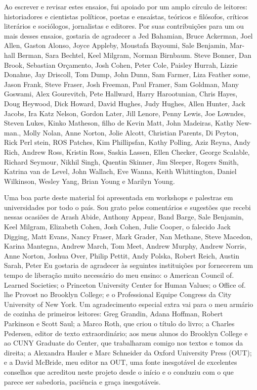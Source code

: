 Ao escrever e revisar estes ensaios, fui apoiado por um amplo círculo de leitores: historiadores e cientistas políticos, poetas e ensaístas, teóricos e filósofos, críticos literários e sociólogos, jornalistas e editores. Por suas contribuições para um ou mais desses ensaios, gostaria de agradecer a Jed Bahamian, Bruce Ackerman, Joel Allen, Gaston Alonso, Joyce Appleby, Moustafa Bayoumi, Sale Benjamin, Mar-hall Berman, Sara Bechtel, Keel Milgram, Norman Birnbaum.  Steve Bonner, Dan Brook, Sebastian Orçamento, Josh Cohen, Peter Cole, Paisley Hurrah, Lizzie Donahue, Jay Driscoll, Tom Dump, John Dunn, Sam Farmer, Liza Feather some, Jason Frank, Steve Fraser, Josh Freeman, Paul Framer, Sam Goldman, Many Goswami, Alex Gourevitch, Pete Hallward, Harry Harootunian, Chris Hayes, Doug Heywood, Dick Howard, David Hughes, Judy Hughes, Allen Hunter, Jack Jacobs, Ira Katz Nelson, Gordon Later, Jill Lenore, Penny Lewis, Joe Lowndes, Steven Lukes, Kinko Matheson, filho de Kevin Matt, John Madeiras, Kathy New-man., Molly Nolan, Anne Norton, Jolie Alcott, Christian Parents, Di Peyton, Rick Perl stein, ROS Patches, Kim Phillipsfan, Kathy Polling, Aziz Reyna, Andy Rich, Andrew Ross, Kristin Ross, Saskia Lassen, Ellen Checker, George Scalable, Richard Seymour, Nikhil Singh, Quentin Skinner, Jim Sleeper, Rogers Smith, Katrina van de Level, John Wallach, Eve Wanna, Keith Whittington, Daniel Wilkinson, Wesley Yang, Brian Young e Marilyn Young.
 
\par
 
Uma boa parte deste material foi apresentada em workshops e palestras em universidades por todo o país. Sou grato pelos comentários e sugestões que recebi nessas ocasiões de Arash Abide, Anthony Appear, Band Barge, Sale Benjamin, Keel Milgram, Elizabeth Cohen, Josh Cohen, Julie Cooper, o falecido Jack Digging, Matt Evans, Nancy Fraser, Mark Grader, Nan Methane, Steve Macedon, Karina Mantegna, Andrew March, Tom Meet, Andrew Murphy, Andrew Norris, Anne Norton, Joshua Over, Philip Pettit, Andy Polska, Robert Reich, Austin Sarah, Peter Eu gostaria de agradecer às seguintes instituições por fornecerem um tempo de liberação muito necessário do meu ensino: o American Council of. Learned Societies; o Princeton University Center for Human Values; o Office of. lhe Provost no Brooklyn College; e o Professional Equipe Congress da City University of New York. Um agradecimento especial extra vai para o meu armário de cozinha de primeiros leitores: Greg Grandin, Adana Hoffman, Robert Parkinson e Scott Saul; a Marco Roth, que criou o título do livro; a Charles Pedersen, editor de texto extraordinário; aos meus alunos do Brooklyn College e ao CUNY Graduate do Center, que trabalharam comigo nos textos e tomos da direita; a Alexandra Hauler e Marc Schneider da Oxford University Press (OUT); e a David McBride, meu editor na OUT, uma fonte inesgotável de excelentes conselhos que acreditou neste projeto desde o início e o conduziu com o que parece ser sabedoria, paciência e graça inesgotáveis.
 

